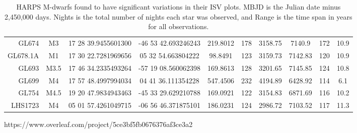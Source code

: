 \begin{table}
\begin{tabular}{|r|c|c|c|c|c|c|c|c|c|}
GL674 & M3 &17 28 39.9455601300 & -46 53 42.693246243 & 219.8012 & 178 & 3158.75 & 7140.9 & 172 & 10.9\\   
GL678.1A & M1 &17 30 22.7281969656 & 05 32 54.663804222 & 98.8491 & 123 & 3159.73 & 7142.83 & 120 & 10.9\\ 
GL693 & M3.5 &17 46 34.2335493264 & -57 19 08.560062398 & 169.8613 & 128 & 3201.65 & 7145.85 & 124 & 10.8\\
GL699 & M4 &17 57 48.4997994034 & 04 41 36.111354228 & 547.4506 & 232 & 4194.89 & 6428.92 & 114 & 6.1\\    
GL754 & M4.5 &19 20 47.9834943463 & -45 33 29.629210788 & 169.0921 & 122 & 3154.83 & 6871.69 & 116 & 10.2\\
LHS1723 & M4 &05 01 57.4261049715 & -06 56 46.371875101 & 186.0231 & 124 & 2986.72 & 7103.52 & 117 & 11.3\\
\hline
    \end{tabular}
    \caption{HARPS M-dwarfs found to have significant variations in their ISV plots. MBJD is the Julian date minus 2,450,000 days. Nights is the total number of nights each star was observed, and Range is the time span in years for all observations.}
    \label{tabMsample}
\end{table}https://www.overleaf.com/project/5ce3bf5fb0676376af3ce3a2
